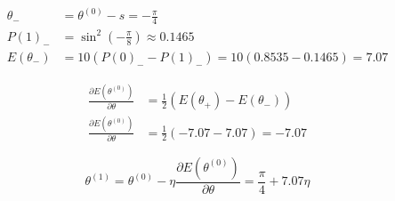 \begin{align}
    \theta_- &= \theta^{(0)} - s = -\frac{\pi}{4} \\
    P(1)_- &= \sin^2\left(-\frac{\pi}{8}\right) \approx 0.1465 \\
    E(\theta_-) &= 10(P(0)_- - P(1)_-) = 10(0.8535 - 0.1465) = 7.07
\end{align}

\begin{align}
    \frac{\partial E(\theta^{(0)})}{\partial \theta} &= \frac{1}{2} (E(\theta_+) - E(\theta_-)) \\
    \frac{\partial E(\theta^{(0)})}{\partial \theta} &= \frac{1}{2} (-7.07 - 7.07) = -7.07
\end{align}

\begin{equation}
    \theta^{(1)} = \theta^{(0)} - \eta \frac{\partial E(\theta^{(0)})}{\partial \theta} = \frac{\pi}{4} + 7.07 \eta
\end{equation}

